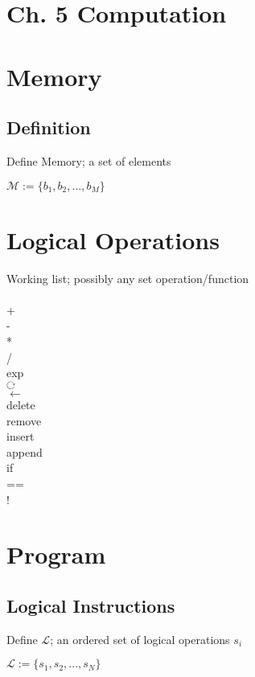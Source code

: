 \documentclass[11pt]{article}
\def \loop {\ensuremath{\rotatebox[origin=c]{-90}{$\circlearrowright$}}}
\begin{document}
\section*{Ch. 5 Computation}




\section{Memory}

\subsection{Definition}
Define Memory; a set of elements
\begin{center}
$\mathcal{M} := \{b_1,b_2,...,b_M\}$
\end{center}



\section{Logical Operations}
Working list; possibly any set operation/function\\
\\
+\\
-\\
*\\
/\\
exp\\
\loop\\
$\leftarrow$\\
delete\\
remove\\
insert\\
append\\
if\\
==\\
!\\





\section{Program}
\subsection{Logical Instructions}
Define $\mathcal{L}$; an ordered set of logical operations $s_i$
\begin{center}
$
\mathcal{L} := \{ s_1,s_2,...,s_{N}\}
$
\end{center}
\end{document}
